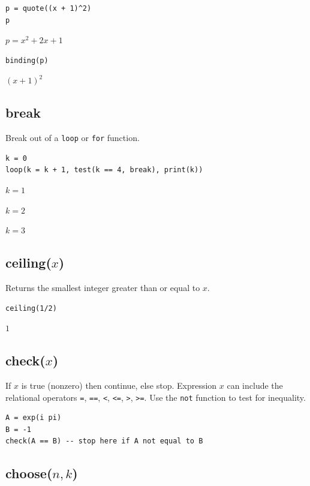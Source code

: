 \documentclass[12pt]{article}
\begin{document}
{\color{blue}
\begin{verbatim}
p = quote((x + 1)^2)
p
\end{verbatim}
}

$p=x^2+2x+1$

{\color{blue}
\begin{verbatim}
binding(p)
\end{verbatim}
}

$(x+1)^2$

\subsection*{break}

Break out of a \verb$loop$ or \verb$for$ function.

{\color{blue}
\begin{verbatim}
k = 0
loop(k = k + 1, test(k == 4, break), print(k))
\end{verbatim}
}

$k=1$

$k=2$

$k=3$

\subsection*{ceiling($x$)}

Returns the smallest integer greater than or equal to $x$.

{\color{blue}
\begin{verbatim}
ceiling(1/2)
\end{verbatim}
}

$1$

\subsection*{check($x$)}

If $x$ is true (nonzero) then continue, else stop.
Expression $x$ can include the relational operators
\verb$=$,
\verb$==$,
\verb$<$,
\verb$<=$,
\verb$>$,
\verb$>=$.
Use the
\verb$not$
function to test for inequality.

{\color{blue}
\begin{verbatim}
A = exp(i pi)
B = -1
check(A == B) -- stop here if A not equal to B
\end{verbatim}
}

\subsection*{choose($n,k$)}
\end{document}
